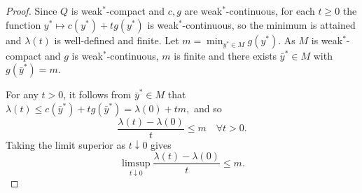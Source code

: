 \documentclass[11pt]{article}
\begin{document}
\begin{proof}
 
	Since $Q$ is weak$^*$-compact and $c, g$ are weak$^*$-continuous, for each $t \ge 0$ the function $y^* \mapsto c(y^*) + t g(y^*)$ is weak$^*$-continuous, so the minimum is attained and $\lambda(t)$ is well-defined and finite.
	Let $m = \min_{y^* \in M} g(y^*)$. As $M$ is weak$^*$-compact and $g$ is weak$^*$-continuous, $m$ is finite and there exists $\bar y^* \in M$ with $g(\bar y^*) = m$.
	
 
	For any $t > 0$,  it follows from $\bar y^* \in M$ that
$	\lambda(t) \le c(\bar y^*) + t g(\bar y^*) = \lambda(0) + t m,$ 
and so
	\[
	\frac{\lambda(t) - \lambda (0)}{t} \le m \quad \forall t>0.
	\]
	Taking the limit superior as $t \downarrow 0$ gives
	\begin{equation}  \label{EtyuK1}
		\limsup_{t \downarrow 0} \frac{\lambda(t) - \lambda(0)}{t} \le m.  
	\end{equation}
	

\end{proof}
\end{document}
